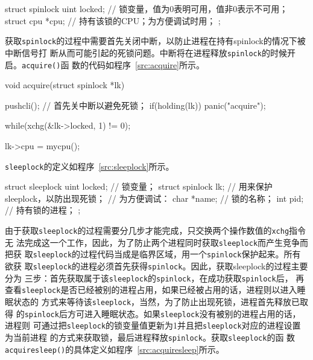 \documentclass{swfcthesismscctex}
\begin{document}
\begin{listing}
  \begin{codeblock}
\begin{ccode}
struct spinlock {
  uint locked; // 锁变量，值为0表明可用，值非0表示不可用；
  struct cpu *cpu; // 持有该锁的CPU；为方便调试时用；
};
\end{ccode}    
  \end{codeblock}
  \label{src:spinlock}
\end{listing}

获取\texttt{spinlock}的过程中需要首先关闭中断，以防止进程在持有spinlock的情况下被中断信号打
断从而可能引起的死锁问题。中断将在进程释放\texttt{spinlock}的时候开启。\texttt{acquire()}函
数的代码如程序~\ref{src:acquire}所示。

\begin{listing}%
  \begin{codeblock}
\begin{ccode}
void acquire(struct spinlock *lk) {
  pushcli(); // 首先关中断以避免死锁；
  if(holding(lk))
    panic("acquire");

  while(xchg(&lk->locked, 1) != 0);

  lk->cpu = mycpu();
}
\end{ccode}
  \end{codeblock}
  \label{src:acquire}
\end{listing}

\texttt{sleeplock}的定义如程序~\ref{src:sleeplock}所示。

\begin{listing}%
  \begin{codeblock}
\begin{ccode}
struct sleeplock {
  uint locked;        // 锁变量；
  struct spinlock lk; // 用来保护sleeplock，以防出现死锁；
  // 为方便调试：
  char *name;         // 锁的名称；
  int pid;            // 持有锁的进程；
};
\end{ccode}
  \end{codeblock}
  \label{src:sleeplock}
\end{listing}

由于获取\texttt{sleeplock}的过程需要分几步才能完成，只交换两个操作数值的\texttt{xchg}指令无
法完成这一个工作，因此，为了防止两个进程同时获取\texttt{sleeplock}而产生竞争而把获
取\texttt{sleeplock}的过程代码当成是临界区域，用一个\texttt{spinlock}保护起来。所有欲获
取\texttt{sleeplock}的进程必须首先获得\texttt{spinlock}。因此，获取sleeplock的过程主要分为
三步：首先获取属于该\texttt{sleeplock}的\texttt{spinlock}，在成功获取\texttt{spinlock}后，
再查看\texttt{sleeplock}是否已经被别的进程占用，如果已经被占用的话，进程则以进入睡眠状态的
方式来等待该\texttt{sleeplock}，当然，为了防止出现死锁，进程首先释放已取得
的\texttt{spinlock}后方可进入睡眠状态。如果\texttt{sleeplock}没有被别的进程占用的话，进程则
可通过把\texttt{sleeplock}的锁变量值更新为1并且把\texttt{sleeplock}对应的进程设置为当前进程
的方式来获取锁，最后进程释放\texttt{spinlock}。获取\texttt{sleeplock}的函
数\texttt{acquiresleep()}的具体定义如程序~\ref{src:acquiresleep}所示。
\end{document}
